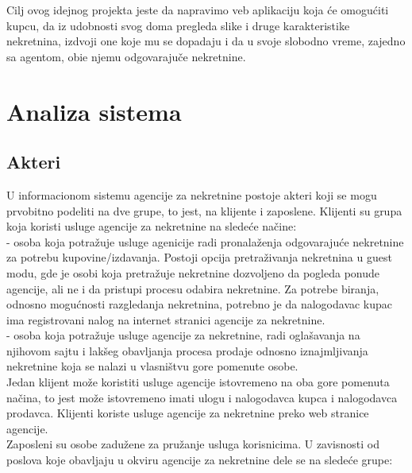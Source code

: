\documentclass[20pt]{article}
\begin{document}
\indent Cilj ovog idejnog projekta jeste da napravimo veb aplikaciju koja \' ce omogu\' citi kupcu, da iz udobnosti svog doma pregleda slike i druge karakteristike nekretnina, izdvoji one koje mu se dopadaju i da u svoje slobodno vreme, zajedno sa agentom, obi\dj e njemu odgovaraju\v{c}e nekretnine.\\

\newpage
\section{\bfseries \Large Analiza sistema}
\subsection{\bfseries \Large Akteri}
\setlength{\parindent}{1cm}
\fontsize{13}{18} \selectfont 

\indent U informacionom sistemu agencije za nekretnine postoje akteri koji se mogu prvobitno podeliti na dve grupe, to jest, na klijente i zaposlene. Klijenti su grupa koja koristi usluge agencije za nekretnine na slede\' ce na\v {c}ine:\\

 - osoba koja potra\v {z}uje usluge agenicije radi pronala\v {z}enja odgovaraju\' ce nekretnine za potrebu kupovine/izdavanja. Postoji opcija pretra\v {z}ivanja nekretnina u guest modu, gde je osobi koja pretra\v {z}uje nekretnine dozvoljeno da pogleda ponude agencije, ali ne i da pristupi procesu odabira nekretnine. Za potrebe biranja, odnosno mogu\' cnosti razgledanja nekretnina, potrebno je da nalogodavac kupac ima registrovani nalog na internet stranici agencije za nekretnine.\\

 - osoba koja potra\v {z}uje usluge agencije za nekretnine, radi ogla\v {s}avanja na njihovom sajtu i lak\v {s}eg obavljanja procesa prodaje odnosno iznajmljivanja nekretnine koja se nalazi u vlasni\v {s}tvu gore pomenute osobe.\\

Jedan klijent mo\v {z}e koristiti usluge agencije istovremeno na oba gore pomenuta na\v{c}ina, to jest mo\v{z}e istovremeno imati ulogu i nalogodavca kupca i nalogodavca prodavca. Klijenti koriste usluge agencije za nekretnine preko web stranice agencije.\\

\indent Zaposleni su osobe zadu\v{z}ene za pru\v{z}anje usluga korisnicima. U zavisnosti od poslova koje obavljaju u okviru agencije za nekretnine dele se na slede\' ce grupe:\\
\end{document}
